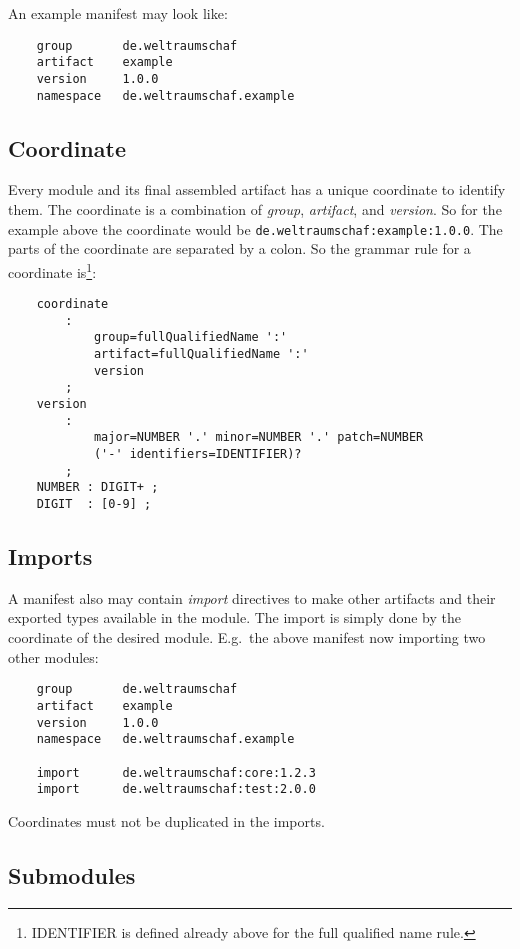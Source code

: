 \documentclass[a4paper,12pt]{report}
\begin{document}
\noindent
An example manifest may look like:

\begin{lstlisting}
    group       de.weltraumschaf
    artifact    example
    version     1.0.0
    namespace   de.weltraumschaf.example
\end{lstlisting}

\subsection{Coordinate}

Every module and its final assembled artifact has a unique coordinate to identify them. The coordinate is a combination of \textit{group}, \textit{artifact}, and \textit{version}. So for the example above the coordinate would be \texttt{de.weltraumschaf:example:1.0.0}. The parts of the coordinate are separated by a colon. So the grammar rule for a coordinate is\footnote{IDENTIFIER is defined already above for the full qualified name rule.}:

\begin{lstlisting}
    coordinate 
        : 
            group=fullQualifiedName ':' 
            artifact=fullQualifiedName ':' 
            version
        ;
    version
        : 
            major=NUMBER '.' minor=NUMBER '.' patch=NUMBER 
            ('-' identifiers=IDENTIFIER)?
        ;        
    NUMBER : DIGIT+ ;
    DIGIT  : [0-9] ;
\end{lstlisting}

\subsection{Imports}

A manifest also may contain \textit{import} directives to make other artifacts and their exported types available in the module. The import is simply done by the coordinate of the desired module. E.g.\ the above manifest now importing two other modules:

\begin{lstlisting}
    group       de.weltraumschaf
    artifact    example
    version     1.0.0
    namespace   de.weltraumschaf.example
    
    import      de.weltraumschaf:core:1.2.3
    import      de.weltraumschaf:test:2.0.0
\end{lstlisting}

Coordinates must not be duplicated in the imports.

\subsection{Submodules}
\end{document}
